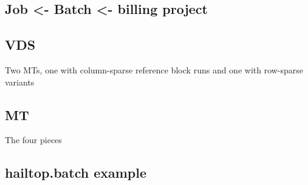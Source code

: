 \documentclass[10pt,a4paper%
]{article}
\begin{document}
\subsection{Job <- Batch <- billing project}

\subsection{VDS}

Two MTs, one with column-sparse reference block runs and one with row-sparse variants

\subsection{MT}

The four pieces

\subsection{hailtop.batch example}




\end{document}
